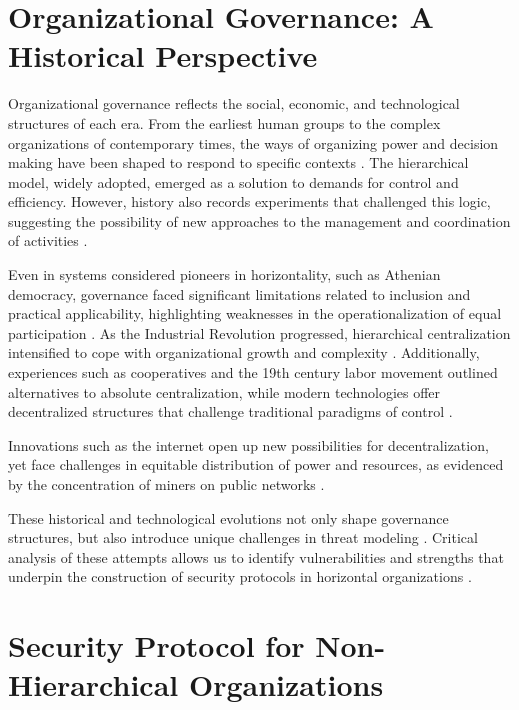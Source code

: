 \section{Organizational Governance: A Historical Perspective}
\label{sec:organizational_governance_historical}

Organizational governance reflects the social, economic, and technological
structures of each era. From the earliest human groups to the complex
organizations of contemporary times, the ways of organizing power and
decision making have been shaped to respond to specific contexts
\cite{Non-HierarchicalForms}. The hierarchical model, widely adopted, emerged as
a solution to demands for control and efficiency. However, history also records
experiments that challenged this logic, suggesting the possibility of new
approaches to the management and coordination of activities
\cite{WorkerCooperativesinAmerica, WorkerCooperativesandRevolution}.

Even in systems considered pioneers in horizontality, such as Athenian
democracy, governance faced significant limitations related to inclusion and
practical applicability, highlighting weaknesses in the operationalization of
equal participation \cite{AthenianDemocracyABrief}. As the Industrial Revolution
progressed, hierarchical centralization intensified to cope with organizational
growth and complexity \cite{WorkerCooperativesandRevolution}. Additionally,
experiences such as cooperatives and the 19th century labor movement outlined
alternatives to absolute centralization, while modern technologies offer
decentralized structures that challenge traditional paradigms of control
\cite{WorkerCooperativesinAmerica, EverydayRevolutions}.

Innovations such as the internet open up new possibilities for decentralization,
yet face challenges in equitable distribution of power and resources, as
evidenced by the concentration of miners on public networks
\cite{Energytheftdetectionissues}.

These historical and technological evolutions not only shape governance
structures, but also introduce unique challenges in threat modeling
\cite{DoArtifactsHavePolitics, Democraciaeoscodigosinvisiveis}. Critical analysis of
these attempts allows us to identify vulnerabilities and strengths that underpin
the construction of security protocols in horizontal organizations
\cite{Colbac}.

\section{Security Protocol for Non-Hierarchical Organizations}
\label{sec:security_protocol_nonhierarchical}

